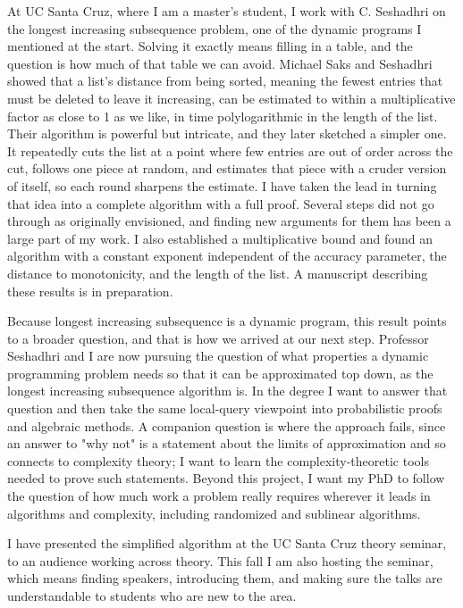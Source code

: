\documentclass[11pt]{article}
\begin{document}
At UC Santa Cruz, where I am a master's student, I work with C. Seshadhri on the longest increasing subsequence problem, one of the dynamic programs I mentioned at the start. Solving it exactly means filling in a table, and the question is how much of that table we can avoid. Michael Saks and Seshadhri showed that a list's distance from being sorted, meaning the fewest entries that must be deleted to leave it increasing, can be estimated to within a multiplicative factor as close to 1 as we like, in time polylogarithmic in the length of the list. Their algorithm is powerful but intricate, and they later sketched a simpler one. It repeatedly cuts the list at a point where few entries are out of order across the cut, follows one piece at random, and estimates that piece with a cruder version of itself, so each round sharpens the estimate. I have taken the lead in turning that idea into a complete algorithm with a full proof. Several steps did not go through as originally envisioned, and finding new arguments for them has been a large part of my work. I also established a multiplicative bound and found an algorithm with a constant exponent independent of the accuracy parameter, the distance to monotonicity, and the length of the list. A manuscript describing these results is in preparation.

Because longest increasing subsequence is a dynamic program, this result points to a broader question, and that is how we arrived at our next step. Professor Seshadhri and I are now pursuing the question of what properties a dynamic programming problem needs so that it can be approximated top down, as the longest increasing subsequence algorithm is. In the degree I want to answer that question and then take the same local-query viewpoint into probabilistic proofs and algebraic methods. A companion question is where the approach fails, since an answer to "why not" is a statement about the limits of approximation and so connects to complexity theory; I want to learn the complexity-theoretic tools needed to prove such statements. Beyond this project, I want my PhD to follow the question of how much work a problem really requires wherever it leads in algorithms and complexity, including randomized and sublinear algorithms.

I have presented the simplified algorithm at the UC Santa Cruz theory seminar, to an audience working across theory. This fall I am also hosting the seminar, which means finding speakers, introducing them, and making sure the talks are understandable to students who are new to the area.
\end{document}
